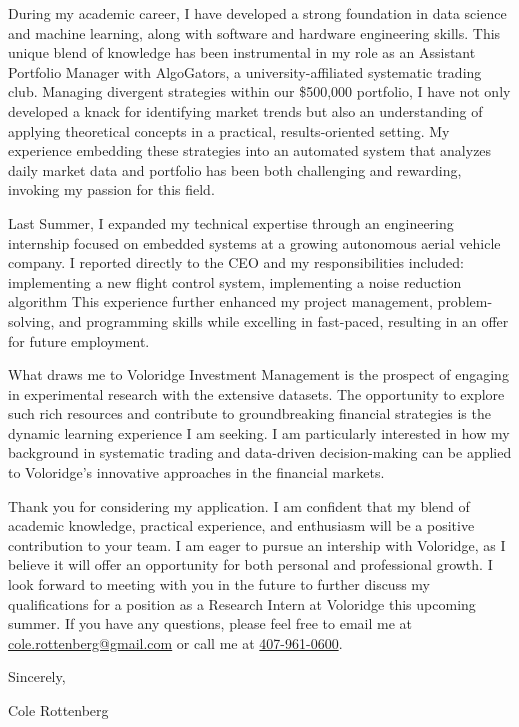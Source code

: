 \documentclass[11pt,a4paper]{article}
\begin{document}
\par
During my academic career, I have developed a strong foundation in data
science and machine learning, along with software and hardware engineering
skills.
This unique blend of knowledge has been instrumental in my role as an
Assistant Portfolio Manager with AlgoGators, a university-affiliated
systematic trading club.
Managing divergent strategies within our \$500,000 portfolio, I have not
only developed a knack for identifying
market trends but also an understanding of applying theoretical
concepts in a practical, results-oriented setting.
My experience embedding these strategies into an automated system that
analyzes daily market data and portfolio has been both challenging and rewarding,
invoking my passion for this field.
\par
Last Summer, I expanded my technical expertise through an
engineering internship focused on embedded systems at a growing
autonomous aerial vehicle company. I reported directly to the CEO and my
responsibilities included:
implementing a new flight control system, implementing a noise reduction
algorithm
This experience further enhanced my project management, problem-solving,
and programming skills while excelling in fast-paced, resulting in an
offer for future employment.
\par
What draws me to Voloridge Investment Management is the prospect of
engaging in experimental research with the extensive datasets.
The opportunity to explore such rich resources and contribute to
groundbreaking financial strategies is the dynamic learning experience I
am seeking. I am particularly interested in how my background in
systematic trading and data-driven decision-making can be applied to
Voloridge's innovative approaches in the financial markets.
\par
Thank you for considering my application. I am confident that my blend
of academic knowledge, practical experience, and enthusiasm will be a
positive contribution to your team. I am eager to pursue an intership
with Voloridge, as I believe it will offer an opportunity for both
personal and professional growth. I look forward to meeting with you in
the future to further discuss my qualifications for a position as a
Research Intern at Voloridge this upcoming summer. If you have any
questions, please feel free to email me at
\href{mailto:cole.rottenberg@gmail.com}{cole.rottenberg@gmail.com}
or call me at \href{tel:+1-407-961-0600}{407-961-0600}.

Sincerely,

Cole Rottenberg
\end{document}
